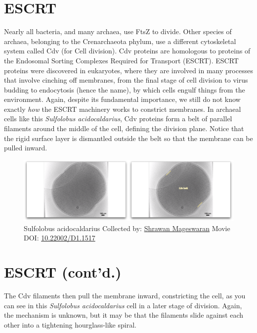 \documentclass[]{tufte-book}
\begin{document}
\section{ESCRT}\label{escrt}

Nearly all bacteria, and many archaea, use FtsZ to divide. Other species
of archaea, belonging to the Crenarchaeota phylum, use a different
cytoskeletal system called Cdv (for Cell division). Cdv proteins are
homologous to proteins of the Endosomal Sorting Complexes Required for
Transport (ESCRT). ESCRT proteins were discovered in eukaryotes, where
they are involved in many processes that involve cinching off membranes,
from the final stage of cell division to virus budding to endocytosis
(hence the name), by which cells engulf things from the environment.
Again, despite its fundamental importance, we still do not know exactly
\emph{how} the ESCRT machinery works to constrict membranes. In archaeal
cells like this \emph{Sulfolobus acidocaldarius}, Cdv proteins form a
belt of parallel filaments around the middle of the cell, defining the
division plane. Notice that the rigid surface layer is dismantled
outside the belt so that the membrane can be pulled inward.





\begin{figure}
\includegraphics{movie_stills/5_11} \caption[Sulfolobus acidocaldarius Collected by:
\protect\hyperlink{shrawan_mageswaran}{Shrawan Mageswaran} Movie DOI:
\href{https://doi.org/10.22002/D1.1517}{10.22002/D1.1517}]{Sulfolobus acidocaldarius Collected by:
\protect\hyperlink{shrawan_mageswaran}{Shrawan Mageswaran} Movie DOI:
\href{https://doi.org/10.22002/D1.1517}{10.22002/D1.1517}}\label{fig:5-11}
\end{figure}

\section{ESCRT (cont'd.)}\label{escrt-contd.}

The Cdv filaments then pull the membrane inward, constricting the cell,
as you can see in this \emph{Sulfolobus acidocaldarius} cell in a later
stage of division. Again, the mechanism is unknown, but it may be that
the filaments slide against each other into a tightening hourglass-like
spiral.
\end{document}
